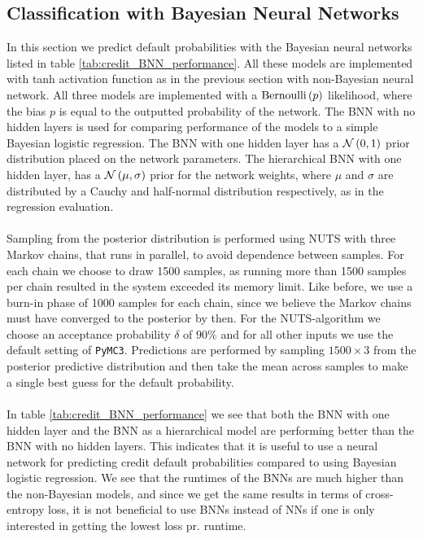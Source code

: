 \subsection{Classification with Bayesian Neural Networks}
In this section we predict default probabilities with the Bayesian neural networks listed in table \ref{tab:credit_BNN_performance}. All these models are implemented with tanh activation function as in the previous section with non-Bayesian neural network. All three models are implemented with a $\operatorname{Bernoulli}\left (p\right)$ likelihood, where the bias $p$ is equal to the outputted probability of the network. The BNN with no hidden layers is used for comparing performance of the models to a simple Bayesian logistic regression. The BNN with one hidden layer has a $\mathcal{N}\left (0,1\right)$ prior distribution placed on the network parameters. The hierarchical BNN with one hidden layer, has a $\mathcal{N}\left (\mu,\sigma\right)$ prior for the network weights, where $\mu$ and $\sigma$ are distributed by a Cauchy and half-normal distribution respectively, as in the regression evaluation. \\
\\
Sampling from the posterior distribution is performed using NUTS with three Markov chains, that runs in parallel, to avoid dependence between samples. For each chain we choose to draw 1500 samples, as running more than 1500 samples per chain resulted in the system exceeded its memory limit. Like before, we use a burn-in phase of 1000 samples for each chain, since we believe the Markov chains must have converged to the posterior by then. For the NUTS-algorithm we choose an
acceptance probability $\delta$ of $90\%$ and for all other inputs we use the default setting of \texttt{PyMC3}. Predictions are performed by sampling $1500 \times 3$ from the posterior predictive distribution and then take the mean across samples to make a single best guess for the default probability. \\
\\
In table \ref{tab:credit_BNN_performance} we see that both the BNN with one hidden layer and the BNN as a hierarchical model are performing better than the BNN with no hidden layers. This indicates that it is useful to use a neural network for predicting credit default probabilities compared to using Bayesian logistic regression. We see that the runtimes of the BNNs are much higher than the non-Bayesian models, and since we get the same results in terms of cross-entropy loss, it is not beneficial to use BNNs instead of NNs if one is only interested in getting the lowest loss pr. runtime.  \\

